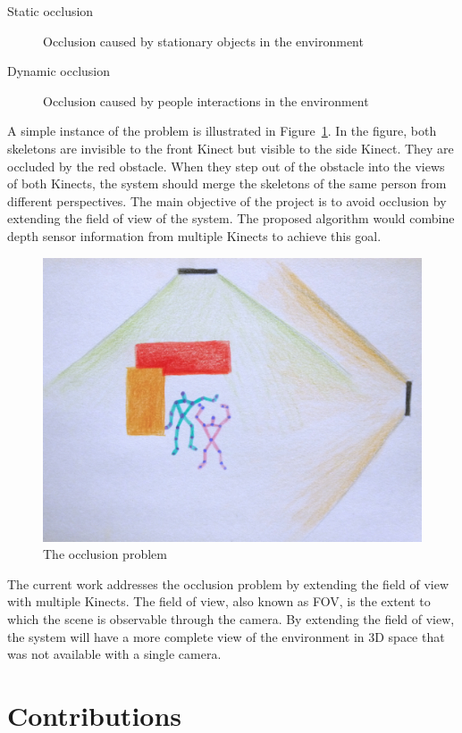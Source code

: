 \begin{description}
  \item[Static occlusion] Occlusion caused by stationary objects in the environment 
  \item[Dynamic occlusion] Occlusion caused by people interactions in the environment
\end{description}

A simple instance of the problem is illustrated in Figure~\ref{fig:occlusion_problem}. In the figure, both skeletons are invisible to the front Kinect but visible to the side Kinect. They are occluded by the red obstacle. When they step out of the obstacle into the views of both Kinects, the system should merge the skeletons of the same person from different perspectives. The main objective of the project is to avoid occlusion by extending the field of view of the system. The proposed algorithm would combine depth sensor information from multiple Kinects to achieve this goal.

\begin{figure}[!h]
  \centering
  \includegraphics[width=0.8\linewidth]{figs/occlusion_problem}
  \caption{The occlusion problem}
  \label{fig:occlusion_problem}
\end{figure}

The current work addresses the occlusion problem by extending the field of view with multiple Kinects. The field of view, also known as FOV, is the extent to which the scene is observable through the camera. By extending the field of view, the system will have a more complete view of the environment in 3D space that was not available with a single camera.

\section{Contributions}
\label{sec:introduction_contributions}

